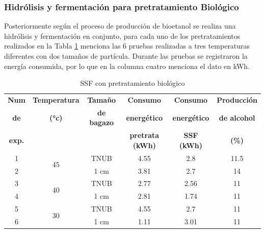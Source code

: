 \documentclass[12pt]{article}
\begin{document}
   	\subsubsection{ Hidrólisis y fermentación para pretratamiento Biológico}
   
   Posteriormente según el proceso de producción de bioetanol se realiza una hidrólisis y fermentación en conjunto, para cada uno de los pretratamientos realizados en la Tabla \ref{ssf Pretratamiento Biológico} menciona las 6 pruebas realizadas a tres temperaturas diferentes con dos tamaños de partícula. Durante las pruebas se registraron la energía consumida, por lo que en la columna cuatro menciona el dato en kWh.

 	\begin{table}[H]
 		\centering
 		\caption{SSF con pretratamiento biológico}
 		\begin{tabular}{|c|c|c|c|c|c|}
 			\hline
 			\textbf{Num }& \textbf{Temperatura}  & \textbf{Tamaño} & \textbf{Consumo } & \textbf{Consumo }  & \textbf{Producción} \\ 
 			\textbf{de}&\textbf{(°c)} &\textbf{de bagazo} & \textbf{energético} & \textbf{energético }&\textbf{de alcohol}\\ 
 				\textbf{exp.}&& & \textbf{ pretrata (kWh)} & \textbf{ SSF (kWh)}&\textbf{(\%)}\\ \hline
 			
 			1 & \multirow{2}{*}{45} & TNUB & 4.55 & 2.8  & 11.5 \\ \cline{1-1} \cline{3-6}
 			2 &                     & 1 cm & 3.81 & 2.7  & 14 \\ \hline
 			3 & \multirow{2}{*}{40} & TNUB & 2.77 & 2.56 & 11 \\ \cline{1-1} \cline{3-6}
 			4 &                     & 1 cm & 2.81 & 1.74  & 11 \\  \hline
 			5 & \multirow{2}{*}{30} & TNUB & 4.55 &2.7  & 11 \\ \cline{1-1} \cline{3-6}
 			6 &                     & 1 cm & 1.11 &3.01 & 11 \\ \hline
 		\end{tabular}
 		\label{ssf Pretratamiento Biológico}
 	\end{table}
 	
 
 	
 	
 

 	
\end{document}
